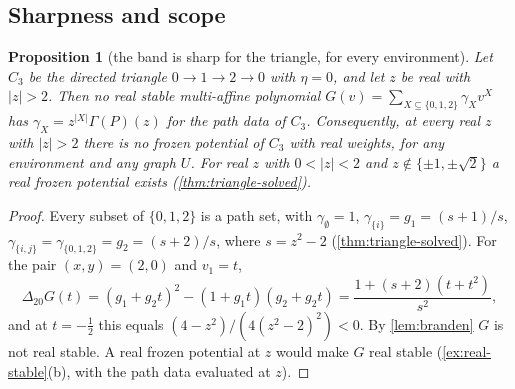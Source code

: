\documentclass[11pt]{amsart}
\theoremstyle{plain}
\newtheorem{proposition}[theorem]{Proposition}
\theoremstyle{definition}
\theoremstyle{remark}
\numberwithin{equation}{section}
\begin{document}
\subsection{Sharpness and scope}

\begin{proposition}[the band is sharp for the triangle, for every environment]\label{prop:triangle-band}
Let $C_3$ be the directed triangle $0\to1\to2\to0$ with $\eta=0$, and let $z$ be real with $|z|>2$. Then no real stable multi-affine polynomial $G(v)=\sum_{X\subseteq\{0,1,2\}}\gamma_Xv^X$ has $\gamma_X=z^{|X|}\Gamma(P)(z)$ for the path data of $C_3$. Consequently, at every real $z$ with $|z|>2$ there is no frozen potential of $C_3$ with real weights, for any environment and any graph $U$. For real $z$ with $0<|z|<2$ and $z\notin\{\pm1,\pm\sqrt2\}$ a real frozen potential exists \textup{(}\cref{thm:triangle-solved}\textup{)}.
\end{proposition}
\begin{proof}
Every subset of $\{0,1,2\}$ is a path set, with $\gamma_\emptyset=1$, $\gamma_{\{i\}}=g_1=(s+1)/s$, $\gamma_{\{i,j\}}=\gamma_{\{0,1,2\}}=g_2=(s+2)/s$, where $s=z^2-2$ (\cref{thm:triangle-solved}). For the pair $(x,y)=(2,0)$ and $v_1=t$,
\[
\Delta_{20}G(t)=(g_1+g_2t)^2-(1+g_1t)(g_2+g_2t)=\frac{1+(s+2)(t+t^2)}{s^2},
\]
and at $t=-\frac12$ this equals $(4-z^2)/(4(z^2-2)^2)<0$. By \cref{lem:branden} $G$ is not real stable. A real frozen potential at $z$ would make $G$ real stable (\cref{ex:real-stable}(b), with the path data evaluated at $z$).
\end{proof}
\end{document}
